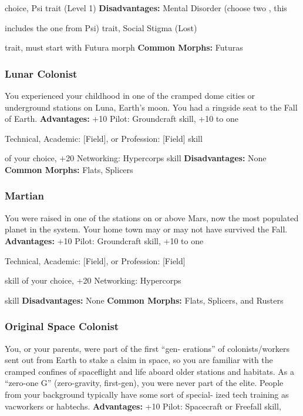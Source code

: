 choice, Psi trait (Level 1)
\textbf{Disadvantages:} Mental Disorder (choose two , this 

includes the one from Psi) trait, Social Stigma (Lost) 

trait, must start with Futura morph
\textbf{Common Morphs:} Futuras

\subsubsection{Lunar Colonist}

You experienced your childhood in one of the cramped 
dome cities or underground stations on Luna, Earth's 
moon. You had a ringside seat to the Fall of Earth.
\textbf{Advantages:} +10 Pilot: Groundcraft skill, +10 to one 

Technical, Academic: [Field], or Profession: [Field] skill 

of your choice, +20 Networking: Hypercorps skill
\textbf{Disadvantages:} None
\textbf{Common Morphs:} Flats, Splicers

\subsubsection{Martian}


You were raised in one of the stations on or above 
Mars, now the most populated planet in the system. 
Your home town may or may not have survived the Fall.
\textbf{Advantages:} +10 Pilot: Groundcraft skill, +10 to one 

Technical, Academic: [Field], or Profession: [Field] 

skill of your choice, +20 Networking: Hypercorps 

skill
\textbf{Disadvantages:} None
\textbf{Common Morphs:} Flats, Splicers, and Rusters

\subsubsection{Original Space Colonist}

You, or your parents, were part of the first  ``gen-
erations'' of colonists/workers sent out from Earth to 
stake a claim in space, so you are familiar with the 
cramped confines of spaceflight and life aboard older 
stations and habitats. As a ``zero-one G'' (zero-gravity, 
first-gen), you were never part of the elite. People from 
your background typically have some sort of special-
ized tech training as vacworkers or habtechs.
\textbf{Advantages:} +10 Pilot: Spacecraft or Freefall skill, 

